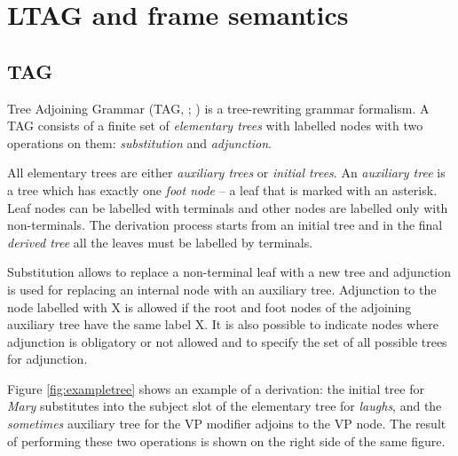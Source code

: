 \section{LTAG and frame semantics}
\subsection{TAG}\label{section:tag}
Tree Adjoining Grammar (TAG, \citealt{JoshiSchabes:97}; \citealt{AbeilleRambow:00}) is a tree-rewriting grammar formalism. A TAG consists of a finite set of \textit{elementary trees} with labelled nodes with two operations on them: \textit{substitution} and \textit{adjunction}. 

All elementary trees are either \textit{auxiliary trees} or \textit{initial trees}. An \textit{auxiliary tree} is a tree which has exactly one \textit{foot node} -- a leaf that is marked with an asterisk. Leaf nodes can be labelled with terminals and other nodes are labelled only with non-terminals. The derivation process starts from an initial tree and in the final \textit{derived tree} all the leaves must be labelled by terminals.

Substitution allows to replace a non-terminal leaf with a new tree and adjunction is used for replacing an internal  node with an auxiliary tree. Adjunction to the node labelled with X is allowed if the root and foot nodes of the adjoining auxiliary tree have the same label X. It is also possible to indicate nodes where adjunction is obligatory or not allowed and to specify the set of all possible trees for adjunction.

Figure \ref{fig:exampletree} shows an example of a derivation: the initial tree for \textit{Mary} substitutes into the subject slot of the elementary tree for \textit{laughs}, and the \textit{sometimes} auxiliary tree for the VP modifier adjoins to the VP node. The result of performing these two operations is shown on the right side of the same figure.

